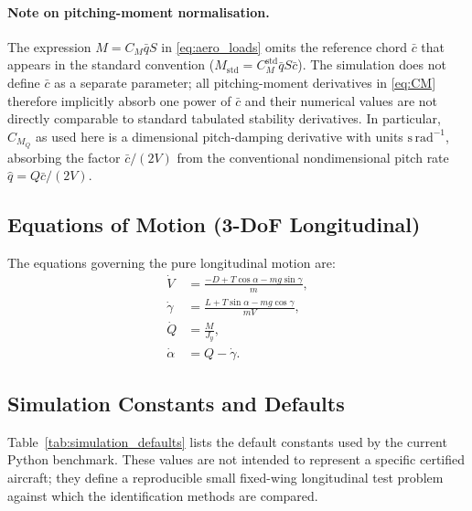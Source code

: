 \documentclass[11pt]{article}
\begin{document}
\paragraph{Note on pitching-moment normalisation.}
The expression $M = C_{M}\bar{q}S$ in \eqref{eq:aero_loads} omits the
reference chord $\bar{c}$ that appears in the standard convention ($M_{\mathrm{std}} = C_{M}^{\mathrm{std}}\bar{q}S\bar{c}$).
The simulation does not define $\bar{c}$ as a separate parameter; all
pitching-moment derivatives in \eqref{eq:CM} therefore implicitly absorb one
power of $\bar{c}$ and their numerical values are not directly comparable to
standard tabulated stability derivatives.
In particular, $C_{M_Q}$ as used here is a {dimensional} pitch-damping
derivative with units $\mathrm{s\,rad^{-1}}$, absorbing the factor
$\bar{c}/(2V)$ from the conventional nondimensional pitch rate
$\hat{q} = Q\bar{c}/(2V)$.
\subsection*{Equations of Motion (3-DoF Longitudinal)}
The equations governing the pure longitudinal motion are:
\begin{equation}
\boxed{
\begin{aligned}
\dot{V}      &= \frac{-D + T\cos\alpha - mg\sin\gamma}{m},\\[3pt]
\dot{\gamma} &= \frac{L + T\sin\alpha - mg\cos\gamma}{mV},\\[3pt]
\dot{Q}      &= \frac{M}{J_y},\\[3pt]
\dot{\alpha} &= Q - \dot{\gamma}.
\end{aligned}}
\label{eq:eom}
\end{equation}
\subsection*{Simulation Constants and Defaults}
Table~\ref{tab:simulation_defaults} lists the default constants used by the
current Python benchmark. These values are not intended to represent a specific
certified aircraft; they define a reproducible small fixed-wing longitudinal
test problem against which the identification methods are compared.
\end{document}
